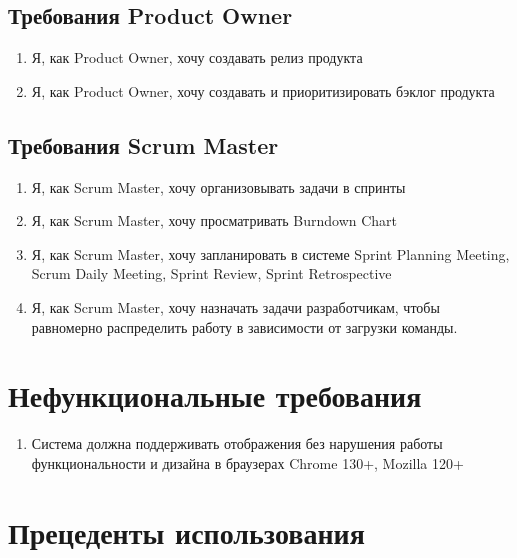 \documentclass{article}
\begin{document}
\subsection{Требования Product Owner}
\begin{enumerate}[label=\textbf{POR\arabic*}.]
  \item Я, как Product Owner, хочу создавать релиз продукта
  \item Я, как Product Owner, хочу создавать и приоритизировать бэклог продукта
\end{enumerate}

\subsection{Требования Scrum Master}
\begin{enumerate}[label=\textbf{SMR\arabic*}.]
  \item Я, как Scrum Master, хочу организовывать задачи в спринты
  \item Я, как Scrum Master, хочу просматривать Burndown Chart
  \item Я, как Scrum Master, хочу запланировать в системе
    Sprint Planning Meeting, Scrum Daily Meeting, Sprint Review, Sprint Retrospective
  \item Я, как Scrum Master, хочу назначать задачи разработчикам, чтобы равномерно распределить работу в зависимости от загрузки команды.
\end{enumerate}


\section{Нефункциональные требования}
\begin{enumerate}[label=\textbf{NFR\arabic*}.]
  \item Система должна поддерживать отображения без нарушения работы функциональности
    и дизайна в браузерах Chrome 130+, Mozilla 120+
\end{enumerate}

\section{Прецеденты использования}
\end{document}
